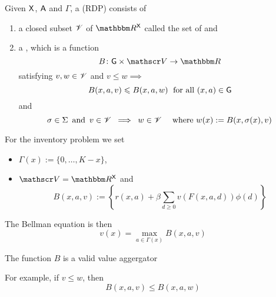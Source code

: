 \begin{frame}
    
    Given $\mathsf X$, $\mathsf A$ and $\Gamma$, a  (RDP) consists of
    
    \begin{enumerate}
        \item a closed subset $\mathscr V$ of $\RR^\Xsf$ called the set of
             and
        \vspace{0.5em}
        \item a  , which is a function
                \begin{equation*}
                    B \colon \Gsf \times \vV \to \RR
                \end{equation*}
              satisfying $v, w \in \mathscr V$ and $v \leq w \implies$
              \vspace{0.5em}
              \begin{equation*}
                B(x, a, v) \leqslant B(x, a, w) \; \text{ for all $(x, a) \in \mathsf G$}
              \end{equation*}
              and 
                \begin{equation*}
                    \sigma \in \Sigma 
                    \, \text{ and } \,
                    v \in \mathscr V
                    \; \implies \;
                    w \in \mathscr V
                    \quad \text{ where }
                    w(x) := B(x, \sigma(x), v)
                \end{equation*}
    \end{enumerate}

\end{frame}


\begin{frame}
    

    \Eg For the inventory problem we set 
    \begin{itemize}
        \item $\Gamma(x) := \{0, \ldots, K - x\}$,
        \item $\vV = \RR^\Xsf$ and
        \begin{equation*}
            B(x, a, v) :=
            \left\{
                r(x, a)
                + \beta
                \sum_{d \geq 0} v(F(x,a,d)) \phi(d)
            \right\}
        \end{equation*}
    \end{itemize}

    The Bellman equation is then 
    $$v(x) = \max_{a \in \Gamma(x)} B(x, a, v)$$

    The function $B$ is a valid value aggergator

    For example, if $v \leq w$, then
    \begin{equation*}
        B(x, a, v) \leq B(x, a, w)
    \end{equation*}

\end{frame}


